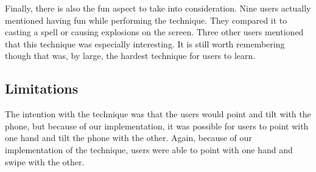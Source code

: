 Finally, there is also the fun aspect to take into consideration. Nine users actually mentioned having fun while performing the \pinch technique. 
They compared it to casting a spell or causing explosions on the screen. Three other users mentioned that this technique was especially interesting. 
It is still worth remembering though that \pinch was, by large, the hardest technique for users to learn. 



\subsection{Limitations}

The intention with the \tilt technique was that the users would point and tilt with the phone, but because of our implementation, it was possible for users to point with one hand and tilt the phone with the other.
Again, because of our implementation of the \swipe technique, users were able to point with one hand and swipe with the other.